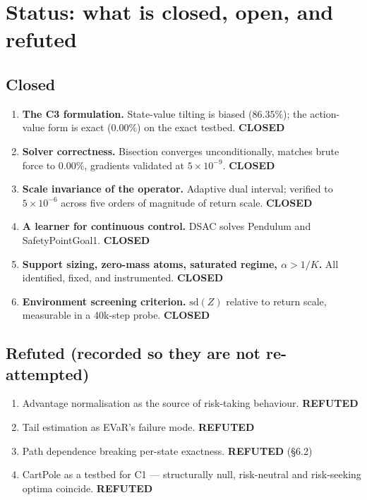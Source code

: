 \documentclass[11pt,a4paper]{article}
\newcommand{\closed}{\textcolor{ok}{\textbf{CLOSED}}}
\newcommand{\refuted}{\textcolor{soft}{\textbf{REFUTED}}}
\begin{document}
\section{Status: what is closed, open, and refuted}

\subsection{Closed}
\begin{enumerate}[leftmargin=1.5em,itemsep=0.2em]
\item \textbf{The C3 formulation.} State-value tilting is biased ($86.35\%$); the
      action-value form is exact ($0.00\%$) on the exact testbed. \closed
\item \textbf{Solver correctness.} Bisection converges unconditionally, matches
      brute force to $0.00\%$, gradients validated at $5\times10^{-9}$. \closed
\item \textbf{Scale invariance of the operator.} Adaptive dual interval; verified to
      $5\times10^{-6}$ across five orders of magnitude of return scale. \closed
\item \textbf{A learner for continuous control.} DSAC solves Pendulum and
      SafetyPointGoal1. \closed
\item \textbf{Support sizing, zero-mass atoms, saturated regime, $\alpha > 1/K$.}
      All identified, fixed, and instrumented. \closed
\item \textbf{Environment screening criterion.} $\mathrm{sd}(Z)$ relative to return
      scale, measurable in a 40k-step probe. \closed
\end{enumerate}

\subsection{Refuted (recorded so they are not re-attempted)}
\begin{enumerate}[leftmargin=1.5em,itemsep=0.2em]
\item Advantage normalisation as the source of risk-taking behaviour. \refuted
\item Tail estimation as EVaR's failure mode. \refuted
\item Path dependence breaking per-state exactness. \refuted{} (\S6.2)
\item CartPole as a testbed for C1 --- structurally null, risk-neutral and
      risk-seeking optima coincide. \refuted
\end{enumerate}
\end{document}
